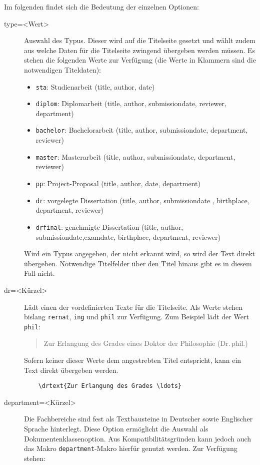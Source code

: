 \documentclass[
	german,%
	ruledheaders=section,%
	class=report,%
	thesis={type=bachelor},%
	accentcolor=9c,%
	custommargins=true,%
	marginpar=false,%
	parskip=half-,%
	fontsize=11pt,%
]{tudapub}
\let\code\texttt
\begin{document}
Im folgenden findet sich die Bedeutung der einzelnen Optionen:
\begin{description}
	\item[type=<Wert>] Auswahl des Typus. Dieser wird auf die Titelseite gesetzt und wählt zudem aus welche Daten für die Titelseite zwingend übergeben werden müssen.
	      Es stehen die folgenden Werte zur Verfügung (die Werte in Klammern sind die notwendigen Titeldaten):
	      \begin{itemize}
		      \item \code{sta}: Studienarbeit (title, author, date)
		      \item \code{diplom}: Diplomarbeit (title, author, submissiondate, reviewer, department)
		      \item \code{bachelor}: Bachelorarbeit (title, author, submissiondate, department, reviewer)
		      \item \code{master}: Masterarbeit (title, author, submissiondate, department, reviewer)
		      \item \code{pp}: Project-Proposal  (title, author, date, department)
		      \item \code{dr}: vorgelegte Dissertation (title, author, submissiondate , birthplace, department, reviewer)
		      \item \code{drfinal}: genehmigte Dissertation (title, author, submissiondate,examdate, birthplace, department, reviewer)
	      \end{itemize}
	      Wird ein Typus angegeben, der nicht erkannt wird, so wird der Text direkt übergeben. Notwendige Titelfelder über den Titel hinaus gibt es in diesem Fall nicht.
	\item[dr=<Kürzel>] Lädt einen der vordefinierten Texte für die Titelseite. Als Werte stehen bislang \code{rernat}, \code{ing} und \code{phil} zur Verfügung. Zum Beispiel lädt der Wert \code{phil}:
	      \begin{quote}
		      Zur Erlangung des Grades eines Doktor der Philosophie (Dr.\,phil.)
	      \end{quote}
	      Sofern keiner dieser Werte dem angestrebten Titel entspricht, kann ein Text direkt übergeben werden.
\begin{verbatim}
    \drtext{Zur Erlangung des Grades \ldots}
\end{verbatim}
	\item[department=<Kürzel>] Die Fachbereiche sind fest als Textbausteine in Deutscher sowie Englischer Sprache hinterlegt. Diese Option ermöglicht die Auswahl als Dokumentenklassenoption. Aus Kompatibilitätsgründen kann jedoch auch das Makro \code{department}-Makro hierfür genutzt werden. Zur Verfügung stehen:\par

\end{description}
\end{document}
